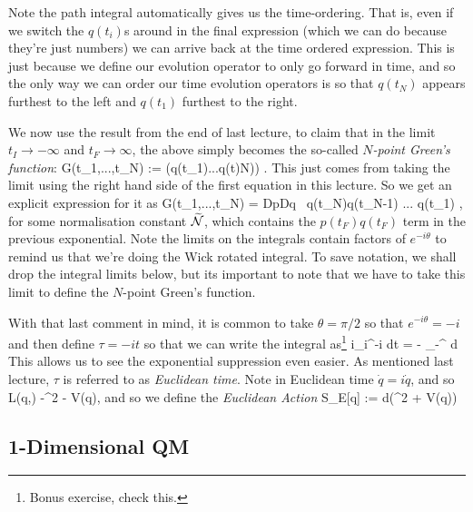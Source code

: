 \br 
\label{rem:PathIntegralTimeOrdered}
    Note the path integral automatically gives us the time-ordering. That is, even if we switch the $q(t_i)$s around in the final expression (which we can do because they're just numbers) we can arrive back at the time ordered expression. This is just because we define our evolution operator to only go forward in time, and so the only way we can order our time evolution operators is so that $q(t_N)$ appears furthest to the left and $q(t_1)$ furthest to the right.
\er 

We now use the result from the end of last lecture, to claim that in the limit $t_I\to-\infty$ and $t_F\to\infty$, the above simply becomes the so-called \textit{$N$-point Green's function}:
\bse 
    G(t_1,...,t_N) := \bra{\Omega} \cT \big(q(t_1)...q(t)N)\big) \ket{\Omega}.
\ese 
This just comes from taking the limit using the right hand side of the first equation in this lecture. So we get an explicit expression for it as 
\bse 
    G(t_1,...,t_N) = \widetilde{\cN} \int DpDq \, q(t_N)q(t_{N-1}) ... q(t_1) \exp {},
\ese 
for some normalisation constant $\widetilde{\mathcal{N}}$, which contains the $p(t_F)q(t_F)$ term in the previous exponential. Note the limits on the integrals contain factors of $e^{-i\theta}$ to remind us that we're doing the Wick rotated integral. To save notation, we shall drop the integral limits below, but its important to note that we have to take this limit to define the $N$-point Green's function.

\br 
\label{rem:EuclideanTime}
    With that last comment in mind, it is common to take $\theta=\pi/2$ so that $e^{-i\theta}=-i$ and then define $\tau=-it$ so that we can write the integral as\footnote{Bonus exercise, check this.} 
    \bse 
        i\int_{i\infty}^{-i\infty} dt = - \int_{-\infty}^{\infty} d\tau
    \ese 
    This allows us to see the exponential suppression even easier. As mentioned last lecture, $\tau$ is referred to as \textit{Euclidean time}. Note in Euclidean time $\dot{q}=i\dot{q}$, and so 
    \bse 
        L(q,) \to -^2 - V(q),
    \ese 
    and so we define the \textit{Euclidean Action}
    \bse 
        S_E[q] := \int d\tau \bigg(^2 + V(q)\bigg)
    \ese 
\er 

\subsection{1-Dimensional QM}

